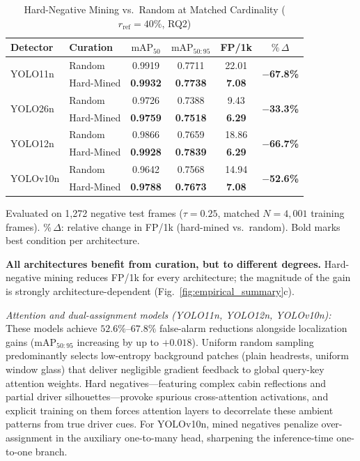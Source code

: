 \documentclass[conference]{IEEEtran}
\begin{document}
\begin{table}[t]
\caption{Hard-Negative Mining vs.\ Random at Matched Cardinality
  ($r_{\mathrm{ref}}{=}40\%$, RQ2)}
\label{tab:rq2}
\centering
\setlength{\tabcolsep}{4pt}
\begin{tabular}{llcccc}
\toprule
\textbf{Detector} & \textbf{Curation} &
\textbf{$\mathrm{mAP}_{50}$} &
\textbf{$\mathrm{mAP}_{50:95}$} &
\textbf{FP/1k} &
\textbf{$\%\,\Delta$} \\
\midrule
\multirow{2}{*}{YOLO11n}
& Random     & 0.9919 & 0.7711 & 22.01 & \multirow{2}{*}{\textbf{$-$67.8\%}} \\
& Hard-Mined & \textbf{0.9932} & \textbf{0.7738} & \textbf{7.08} & \\
\midrule
\multirow{2}{*}{YOLO26n}
& Random     & 0.9726 & 0.7388 & 9.43  & \multirow{2}{*}{\textbf{$-$33.3\%}} \\
& Hard-Mined & \textbf{0.9759} & \textbf{0.7518} & \textbf{6.29} & \\
\midrule
\multirow{2}{*}{YOLO12n}
& Random     & 0.9866 & 0.7659 & 18.86 & \multirow{2}{*}{\textbf{$-$66.7\%}} \\
& Hard-Mined & \textbf{0.9928} & \textbf{0.7839} & \textbf{6.29} & \\
\midrule
\multirow{2}{*}{YOLOv10n}
& Random     & 0.9642 & 0.7568 & 14.94 & \multirow{2}{*}{\textbf{$-$52.6\%}} \\
& Hard-Mined & \textbf{0.9788} & \textbf{0.7673} & \textbf{7.08} & \\
\bottomrule
\end{tabular}
\vspace{1pt}
{\footnotesize Evaluated on 1,272 negative test frames
($\tau{=}0.25$, matched $N{=}4{,}001$ training frames).
$\%\,\Delta$: relative change in FP/1k (hard-mined vs.\ random).
Bold marks best condition per architecture.}
\end{table}

\noindent\textbf{All architectures benefit from curation, but to different degrees.}
Hard-negative mining reduces FP/1k for every architecture; the
magnitude of the gain is strongly architecture-dependent
(Fig.~\ref{fig:empirical_summary}c).

\noindent\textit{Attention and dual-assignment models (YOLO11n, YOLO12n,
YOLOv10n):} These models achieve $52.6\%$--$67.8\%$ false-alarm
reductions alongside localization gains
($\mathrm{mAP}_{50:95}$ increasing by up to $+0.018$). Uniform
random sampling predominantly selects low-entropy background patches
(plain headrests, uniform window glass) that deliver negligible
gradient feedback to global query-key attention weights. Hard
negatives---featuring complex cabin reflections and partial driver
silhouettes---provoke spurious cross-attention activations, and
explicit training on them forces attention layers to decorrelate
these ambient patterns from true driver cues. For YOLOv10n, mined
negatives penalize over-assignment in the auxiliary one-to-many head,
sharpening the inference-time one-to-one branch.
\end{document}
